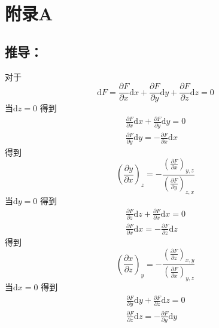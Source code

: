 \section{附录A}


\subsection{推导：}
对于
\begin{equation}
    \mathrm{d}F=\frac{\partial F}{\partial x}\mathrm{d}x+\frac{\partial F}{\partial y}\mathrm{d}y+\frac{\partial F}{\partial z}\mathrm{d}z=0
\end{equation}
当$\mathrm{d}z=0$
得到
\begin{equation}
    \begin{aligned}
        \frac{\partial F}{\partial x}\mathrm{d}x+\frac{\partial F}{\partial y}\mathrm{d}y=0
\\
\frac{\partial F}{\partial y}\mathrm{d}y=-\frac{\partial F}{\partial x}\mathrm{d}x
    \end{aligned}
\end{equation}
得到
\begin{equation}
    \left( \frac{\partial y}{\partial x} \right) _z=-\frac{\left( \frac{\partial F}{\partial x} \right) _{y,z}}{\left( \frac{\partial F}{\partial y} \right) _{z,x}}
\end{equation}
当$\mathrm{d}y=0$
得到
\begin{equation}
    \begin{aligned}
        \frac{\partial F}{\partial z}\mathrm{d}z+\frac{\partial F}{\partial x}\mathrm{d}x=0
\\
\frac{\partial F}{\partial x}\mathrm{d}x=-\frac{\partial F}{\partial z}\mathrm{d}z
    \end{aligned}
\end{equation}
得到
\begin{equation}
    \left( \frac{\partial x}{\partial z} \right) _y=-\frac{\left( \frac{\partial F}{\partial z} \right) _{x,y}}{\left( \frac{\partial F}{\partial x} \right) _{y,z}}
\end{equation}
当$\mathrm{d}x=0$
得到
\begin{equation}
    \begin{aligned}
        \frac{\partial F}{\partial y}\mathrm{d}y+\frac{\partial F}{\partial z}\mathrm{d}z=0
\\
\frac{\partial F}{\partial z}\mathrm{d}z=-\frac{\partial F}{\partial y}\mathrm{d}y
    \end{aligned}
\end{equation}
